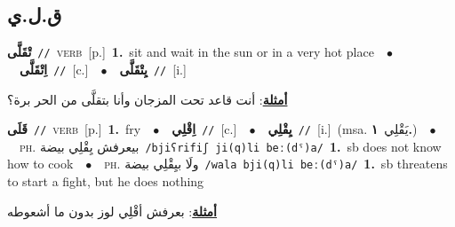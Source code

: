 \documentclass[10pt,a4paper,twoside]{article} %
\begin{document}
\begin{multicols}{2}
\vspace{-3mm}
\subsection*{\color{blue}\foreignlanguage{arabic}{ق.ل.ي}\color{blue}{}} 

{\setlength\topsep{0pt}\textbf{\foreignlanguage{arabic}{تْقَلَّى}}\ {\color{gray}\texttt{//}\color{black}}\ \textsc{verb}\ [p.]\ \textbf{1.}~sit and wait in the sun or in a very hot place\ \ $\bullet$\ \ \setlength\topsep{0pt}\textbf{\foreignlanguage{arabic}{اِتْقَلَّى}}\ {\color{gray}\texttt{//}\color{black}}\ [c.]\ \ $\bullet$\ \ \setlength\topsep{0pt}\textbf{\foreignlanguage{arabic}{يِتْقَلَّى}}\ {\color{gray}\texttt{//}\color{black}}\ [i.]\  \begin{flushright}\color{gray}\foreignlanguage{arabic}{\textbf{\underline{\foreignlanguage{arabic}{أمثلة}}}: أنت قاعد تحت المزجان وأنا بتقلَّى من الحر برة؟}\end{flushright}\color{black}} \vspace{2mm}

{\setlength\topsep{0pt}\textbf{\foreignlanguage{arabic}{قَلَى}}\ {\color{gray}\texttt{//}\color{black}}\ \textsc{verb}\ [p.]\ \textbf{1.}~fry\ \ $\bullet$\ \ \setlength\topsep{0pt}\textbf{\foreignlanguage{arabic}{اِقْلِي}}\ {\color{gray}\texttt{//}\color{black}}\ [c.]\ \ $\bullet$\ \ \setlength\topsep{0pt}\textbf{\foreignlanguage{arabic}{يِقْلِي}}\ {\color{gray}\texttt{//}\color{black}}\ [i.]\ \color{gray}(msa. \foreignlanguage{arabic}{يَقْلِي}~\foreignlanguage{arabic}{\textbf{١.}})\color{black}\ \ $\bullet$\ \ \textsc{ph.} \color{gray} \foreignlanguage{arabic}{بيعرفش يِقْلِي بيضة}\color{black}\ {\color{gray}\texttt{/{\sffamily bjiʕrifiʃ ji(q)li beː(dˤ)a}/}\color{black}}\ \textbf{1.}~sb does not know how to cook\ \ $\bullet$\ \ \textsc{ph.} \color{gray} \foreignlanguage{arabic}{ولَا بيِقْلِي بيضة}\color{black}\ {\color{gray}\texttt{/{\sffamily wala bji(q)li beː(dˤ)a}/}\color{black}}\ \textbf{1.}~sb threatens to start a fight, but he does nothing\  \begin{flushright}\color{gray}\foreignlanguage{arabic}{\textbf{\underline{\foreignlanguage{arabic}{أمثلة}}}: بعرفش أقْلِي لوز بدون ما أشعوطه}\end{flushright}\color{black}} \vspace{2mm}


\end{multicols}
\end{document}
